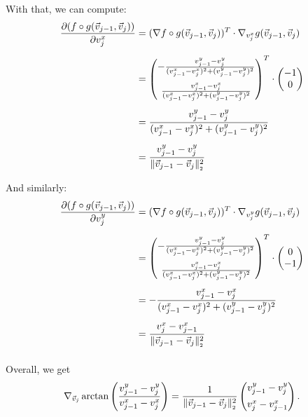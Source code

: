\begin{proposition}
	With that, we can compute:
	\begin{align*}
		\frac{\partial (f \circ g (\vec{v}_{j-1}, \vec{v}_j))}{\partial v_j^{x}} &= (\nabla f \circ g (\vec{v}_{j-1}, \vec{v}_j))^T \cdot \nabla_{v_j^{x}} g (\vec{v}_{j-1}, \vec{v}_j) \\[0.5em]
		&= \begin{pmatrix}
			- \frac{v_{j-1}^{y} - v_{j}^{y}}{(v_{j-1}^{x} - v_{j}^{x})^2 + (v_{j-1}^{y} - v_{j}^{y})^2} \\[1.0em]
			\frac{v_{j-1}^{x} - v_{j}^{x}}{(v_{j-1}^{x} - v_{j}^{x})^2 + (v_{j-1}^{y} - v_{j}^{y})^2}
		\end{pmatrix}^T
		\cdot 
		\begin{pmatrix}
			-1 \\
			0
		\end{pmatrix} \\[0.5em]
		&= \frac{v_{j-1}^{y} - v_{j}^{y}}{(v_{j-1}^{x} - v_{j}^{x})^2 + (v_{j-1}^{y} - v_{j}^{y})^2} \\[0.5em]
		&= \frac{v_{j-1}^{y} - v_{j}^{y}}{\norm[\vec{v}_{j-1} - \vec{v}_j]^2}
	\end{align*}

	And similarly:
	\begin{align*}
		\frac{\partial (f \circ g (\vec{v}_{j-1}, \vec{v}_j))}{\partial v_j^{y}} &= (\nabla f \circ g (\vec{v}_{j-1}, \vec{v}_j))^T \cdot \nabla_{v_j^{y}} g (\vec{v}_{j-1}, \vec{v}_j) \\[0.5em]
		&= \begin{pmatrix}
			- \frac{v_{j-1}^{y} - v_{j}^{y}}{(v_{j-1}^{x} - v_{j}^{x})^2 + (v_{j-1}^{y} - v_{j}^{y})^2} \\[1.0em]
			\frac{v_{j-1}^{x} - v_{j}^{x}}{(v_{j-1}^{x} - v_{j}^{x})^2 + (v_{j-1}^{y} - v_{j}^{y})^2}
		\end{pmatrix}^T
		\cdot 
		\begin{pmatrix}
			0 \\
			-1
		\end{pmatrix} \\[0.5em]
		&= - \frac{v_{j-1}^{x} - v_{j}^{x}}{(v_{j-1}^{x} - v_{j}^{x})^2 + (v_{j-1}^{y} - v_{j}^{y})^2} \\[0.5em]
		&= \frac{v_{j}^{x} - v_{j-1}^{x}}{\norm[\vec{v}_{j-1} - \vec{v}_j]^2} \\[0.5em]
	\end{align*}

	Overall, we get 
	\begin{align*}
		\nabla_{\vec{v}_j} \arctan \left(\frac{v_{j-1}^{y} - v_{j}^{y}}{v_{j-1}^{x} - v_{j}^{x}} \right) = \frac{1}{\norm[\vec{v}_{j-1} - \vec{v}_j]^2} \begin{pmatrix}
			v_{j-1}^{y} - v_{j}^{y} \\[0.5em]
			v_{j}^{x} - v_{j-1}^{x}
		\end{pmatrix}.
	\end{align*}
	

\end{proposition}
